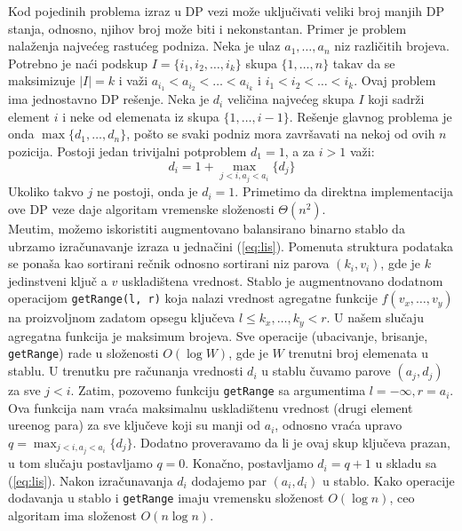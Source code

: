 \documentclass[a4paper,12pt]{article}
\numberwithin{equation}{subsection}
\begin{document}
Kod pojedinih problema izraz u DP vezi mo\v ze uklju\v civati veliki broj manjih DP stanja, odnosno, njihov broj mo\v ze biti i nekonstantan. Primer je problem nala\v zenja najve\' ceg rastu\' ceg podniza. Neka je ulaz $a_1, \ldots, a_n$ niz razli\v citih brojeva. Potrebno je na\' ci podskup $I = \{ i_1, i_2, \ldots, i_k \}$ skupa $\{ 1, \ldots, n \}$ takav da se maksimizuje $|I| = k$ i va\v zi $a_{i_1} < a_{i_2} < \ldots < a_{i_k}$ i $i_1 < i_2 < \ldots < i_k$. Ovaj problem ima jednostavno DP re\v senje. Neka je $d_i$ veli\v cina najve\' ceg skupa $I$ koji sadr\v zi element $i$ i neke od elemenata iz skupa $\{ 1, \ldots, i-1 \}$. Re\v senje glavnog problema je onda $\max \{ d_1, \ldots, d_n \}$, po\v sto se svaki podniz mora zavr\v savati na nekoj od ovih $n$ pozicija. Postoji jedan trivijalni potproblem $d_1 = 1$, a za $i>1$ va\v zi:
\begin{equation} \label{eq:lis}
	d_i = 1 + \max_{j<i, a_j < a_i} \{ d_j \}
\end{equation}
Ukoliko takvo $j$ ne postoji, onda je $d_i = 1$. Primetimo da direktna implementacija ove DP veze daje algoritam vremenske slo\v zenosti $\Theta(n^2)$.
\\

Me\dj utim, mo\v zemo iskoristiti augmentovano balansirano binarno stablo da ubrzamo izra\v cunavanje izraza u jedna\v cini (\ref{eq:lis}). Pomenuta struktura podataka se pona\v sa kao sortirani re\v cnik odnosno sortirani niz parova $(k_i, v_i)$, gde je $k$ jedinstveni klju\v c a $v$ uskladi\v stena vrednost. Stablo je augmentnovano dodatnom operacijom \texttt{getRange(l, r)} koja nalazi vrednost agregatne funkcije $f(v_x, \ldots, v_y)$ na proizvoljnom zadatom opsegu klju\v ceva $l \leq k_x, \ldots, k_y < r$. U na\v sem slu\v caju agregatna funkcija je maksimum brojeva. Sve operacije (ubacivanje, brisanje, \texttt{getRange}) rade u slo\v zenosti $O(\log W)$, gde je $W$ trenutni broj elemenata u stablu. U trenutku pre ra\v cunanja vrednosti $d_i$ u stablu \v cuvamo parove $(a_j, d_j)$ za sve $j < i$. Zatim, pozovemo funkciju \texttt{getRange} sa argumentima $l = -\infty, r = a_i$. Ova funkcija nam vra\' ca maksimalnu uskladi\v stenu vrednost (drugi element ure\dj enog para) za sve klju\v ceve koji su manji od $a_i$, odnosno vra\' ca upravo $q = \max_{j<i, a_j < a_i} \{ d_j \}$. Dodatno proveravamo da li je ovaj skup klju\v ceva prazan, u tom slu\v caju postavljamo $q = 0$. Kona\v cno, postavljamo $d_i = q + 1$ u skladu sa (\ref{eq:lis}). Nakon izra\v cunavanja $d_i$ dodajemo par $(a_i, d_i)$ u stablo. Kako operacije dodavanja u stablo i \texttt{getRange} imaju vremensku slo\v zenost $O(\log n)$, ceo algoritam ima slo\v zenost $O(n \log n)$.
\\
\end{document}
